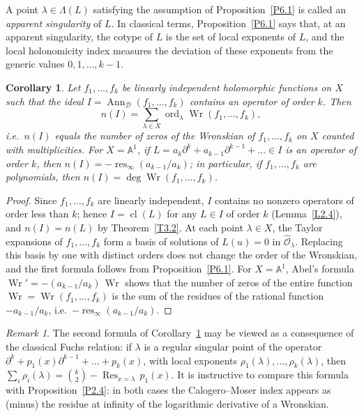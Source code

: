 \documentclass[11pt,reqno]{amsart}
\theoremstyle{plain}
\newtheorem{corollary}{Corollary}[section]
\theoremstyle{definition}
\theoremstyle{remark}
\newtheorem*{remark}{Remark}
\numberwithin{equation}{section}
\newcommand{\cD}{\mathcal{D}}
\newcommand{\cO}{\mathcal{O}}
\newcommand{\A}{\mathbb{A}}
\newcommand{\del}{\partial}
\newcommand{\hO}{\widehat{\cO}}
\DeclareMathOperator{\Ann}{Ann}
\DeclareMathOperator{\cl}{cl}
\DeclareMathOperator{\ord}{ord}
\DeclareMathOperator{\Wr}{Wr}
\DeclareMathOperator{\res}{res}
\DeclareMathOperator{\Res}{Res}
\begin{document}
A point $\lambda \in \Lambda(L)$ satisfying the assumption of Proposition~\ref{P6.1} is called an
\emph{apparent singularity} of $L$. In classical terms, Proposition~\ref{P6.1} says that, at an
apparent singularity, the cotype of $L$ is the set of local exponents of $L$, and the local
holonomicity index measures the deviation of these exponents from the generic values
$0, 1, \ldots, k-1$.

\begin{corollary}
\label{C6.1}
Let $f_1, \ldots, f_k$ be linearly independent holomorphic functions on $X$ such that the ideal
$I = \Ann_{\cD}(f_1, \ldots, f_k)$ contains an operator of order $k$. Then
\[
  n(I) = \sum_{\lambda \in X} \ord_\lambda \Wr(f_1, \ldots, f_k) ,
\]
i.e.\ $n(I)$ equals the number of zeros of the Wronskian of $f_1, \ldots, f_k$ on $X$ counted with
multiplicities. For $X = \A^1$, if $L = a_k \del^k + a_{k-1} \del^{k-1} + \ldots \in I$ is an
operator of order $k$, then $n(I) = - \res_\infty (a_{k-1}/a_k)$; in particular, if $f_1, \ldots,
f_k$ are polynomials, then $n(I) = \deg \Wr(f_1, \ldots, f_k)$.
\end{corollary}

\begin{proof}
Since $f_1, \ldots, f_k$ are linearly independent, $I$ contains no nonzero operators of order less
than $k$; hence $I = \cl(L)$ for any $L \in I$ of order $k$ (Lemma~\ref{L2.4}), and $n(I) = n(L)$
by Theorem~\ref{T3.2}. At each point $\lambda \in X$, the Taylor expansions of $f_1, \ldots, f_k$
form a basis of solutions of $L(u) = 0$ in $\hO_\lambda$. Replacing this basis by one with distinct
orders does not change the order of the Wronskian, and the first formula follows from
Proposition~\ref{P6.1}. For $X = \A^1$, Abel's formula $\Wr' = - (a_{k-1}/a_k)\, \Wr$ shows that
the number of zeros of the entire function $\Wr = \Wr(f_1, \ldots, f_k)$ is the sum of the
residues of the rational function $- a_{k-1}/a_k$, i.e.\ $- \res_\infty (a_{k-1}/a_k)$.
\end{proof}

\begin{remark}
The second formula of Corollary~\ref{C6.1} may be viewed as a consequence of the classical Fuchs
relation: if $\lambda$ is a regular singular point of the operator $\del^k + p_1(x) \del^{k-1} +
\ldots + p_k(x)$, with local exponents $\rho_1(\lambda), \ldots, \rho_k(\lambda)$, then $\sum_i
\rho_i(\lambda) = \binom{k}{2} - \Res_{x = \lambda}\, p_1(x)$. It is instructive to compare this
formula with Proposition~\ref{P2.4}: in both cases the Calogero--Moser index appears as (minus)
the residue at infinity of the logarithmic derivative of a Wronskian.
\end{remark}
\end{document}

